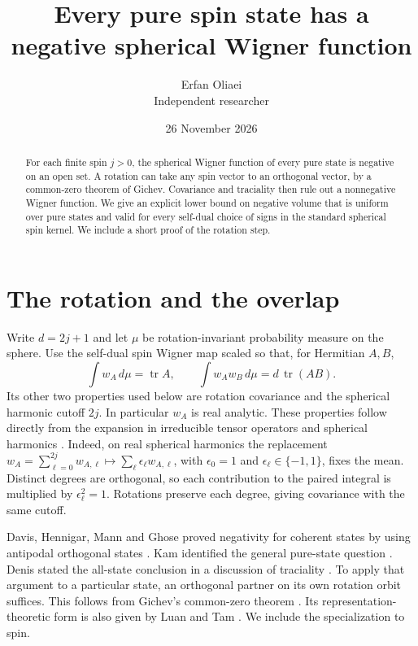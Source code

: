 \documentclass[10pt,a4paper]{article}
\author{Erfan Oliaei\\[2pt]\small Independent researcher}
\date{26 November 2026}
\title{Every pure spin state has a negative spherical Wigner function}
\newcommand{\tr}{\operatorname{tr}}
\begin{document}
\maketitle
\begin{abstract}
For each finite spin \(j>0\), the spherical Wigner function of every pure state is negative on an open set. A rotation can take any spin vector to an orthogonal vector, by a common-zero theorem of Gichev. Covariance and traciality then rule out a nonnegative Wigner function. We give an explicit lower bound on negative volume that is uniform over pure states and valid for every self-dual choice of signs in the standard spherical spin kernel. We include a short proof of the rotation step.
\end{abstract}

\section{The rotation and the overlap}
Write \(d=2j+1\) and let \(\mu\) be rotation-invariant probability measure on the sphere. Use the self-dual spin Wigner map scaled so that, for Hermitian \(A,B\),
\begin{equation}\label{eq:trace}
 \int w_A\,d\mu=\tr A,\qquad
 \int w_A w_B\,d\mu=d\,\tr(AB).
\end{equation}
Its other two properties used below are rotation covariance and the spherical harmonic cutoff \(2j\). In particular \(w_A\) is real analytic. These properties follow directly from the expansion in irreducible tensor operators and spherical harmonics \cite{davis21,davis23}. Indeed, on real spherical harmonics the replacement \(w_A=\sum_{\ell=0}^{2j}w_{A,\ell}\mapsto\sum_\ell\epsilon_\ell w_{A,\ell}\), with \(\epsilon_0=1\) and \(\epsilon_\ell\in\{-1,1\}\), fixes the mean. Distinct degrees are orthogonal, so each contribution to the paired integral is multiplied by \(\epsilon_\ell^2=1\). Rotations preserve each degree, giving covariance with the same cutoff.

Davis, Hennigar, Mann and Ghose proved negativity for coherent states by using antipodal orthogonal states \cite{davis23}. Kam identified the general pure-state question \cite{kam}. Denis stated the all-state conclusion in a discussion of traciality \cite[Sec.~1.2.2.1, p.~28]{denis}. To apply that argument to a particular state, an orthogonal partner on its own rotation orbit suffices. This follows from Gichev's common-zero theorem \cite{gichev}. Its representation-theoretic form is also given by Luan and Tam \cite[Lemma~3.2]{luan}. We include the specialization to spin.
\end{document}
